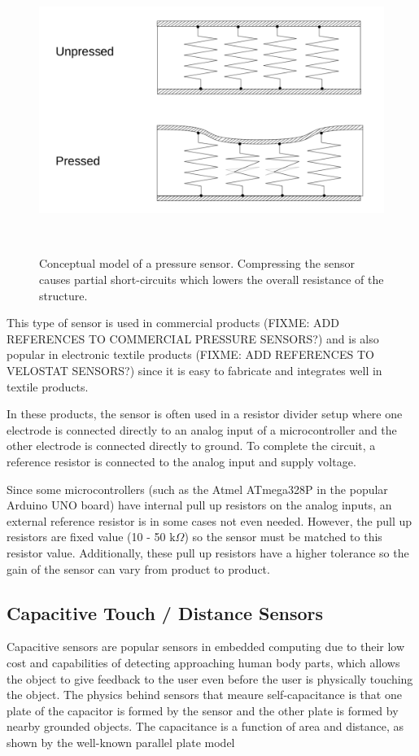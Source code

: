 \documentclass{sigchi-ext}
\begin{document}
\begin{figure}[!htbp]
\centering
  \includegraphics[width=0.9\columnwidth]{figures/resistive_sensor}
  \caption{Conceptual model of a pressure sensor. Compressing the sensor causes
  partial short-circuits which lowers the overall resistance of the
  structure.}~\label{fig:pressure_sensor}
\end{figure}

This type of sensor is used in commercial products (FIXME: ADD REFERENCES TO
COMMERCIAL PRESSURE SENSORS?) and is also popular in electronic textile products
(FIXME: ADD REFERENCES TO VELOSTAT SENSORS?) since it is easy to fabricate and
integrates well in textile products.

In these products, the sensor is often used in a resistor divider setup where
one electrode is connected directly to an analog input of a microcontroller and
the other electrode is connected directly to ground. To complete the circuit, a
reference resistor is connected to the analog input and supply voltage.

Since some microcontrollers (such as the Atmel ATmega328P in the popular Arduino
UNO board) have internal pull up resistors on the analog inputs, an external
reference resistor is in some cases not even needed. However, the pull up
resistors are fixed value (10 - 50 $\textrm{k}\Omega$) so the sensor must be matched to
this resistor value. Additionally, these pull up resistors have a higher
tolerance so the gain of the sensor can vary from product to product.

\subsection{Capacitive Touch / Distance Sensors}
Capacitive sensors are popular sensors in embedded computing due to their low cost
and capabilities of detecting approaching human body parts, which allows the
object to give feedback to the user even before the user is physically touching
the object. The physics behind sensors that meaure self-capacitance is that one
plate of the capacitor is formed by the sensor and the other plate is formed by
nearby grounded objects. The capacitance is a function of area and distance, as
shown by the well-known parallel plate model
\end{document}
